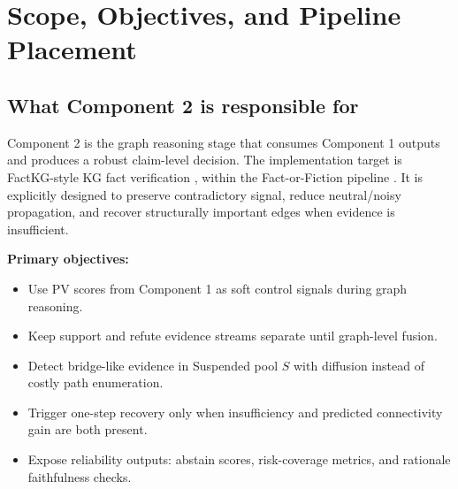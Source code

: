 \section{Scope, Objectives, and Pipeline Placement}
\label{sec:scope}

\subsection{What Component 2 is responsible for}
Component 2 is the graph reasoning stage that consumes Component 1 outputs and produces a robust claim-level decision.
The implementation target is FactKG-style KG fact verification \cite{kim2023factkg}, within the Fact-or-Fiction pipeline \cite{opsahl2024factorfiction}.
It is explicitly designed to preserve contradictory signal, reduce neutral/noisy propagation, and recover structurally important edges when evidence is insufficient.

\textbf{Primary objectives:}
\begin{itemize}
\item Use PV scores from Component 1 as soft control signals during graph reasoning.
\item Keep support and refute evidence streams separate until graph-level fusion.
\item Detect bridge-like evidence in Suspended pool $S$ with diffusion instead of costly path enumeration.
\item Trigger one-step recovery only when insufficiency and predicted connectivity gain are both present.
\item Expose reliability outputs: abstain scores, risk-coverage metrics, and rationale faithfulness checks.
\end{itemize}

